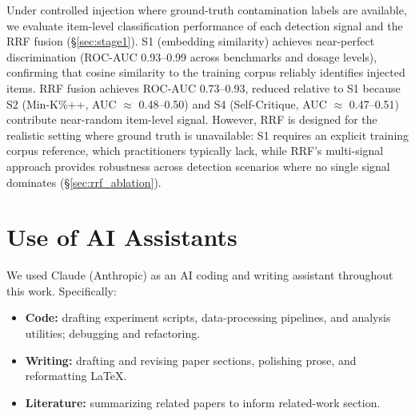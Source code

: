 Under controlled injection where ground-truth contamination labels are available, we evaluate item-level classification performance of each detection signal and the RRF fusion (\S\ref{sec:stage1}). S1 (embedding similarity) achieves near-perfect discrimination (ROC-AUC 0.93--0.99 across benchmarks and dosage levels), confirming that cosine similarity to the training corpus reliably identifies injected items. RRF fusion achieves ROC-AUC 0.73--0.93, reduced relative to S1 because S2 (Min-K\%++, AUC $\approx$ 0.48--0.50) and S4 (Self-Critique, AUC $\approx$ 0.47--0.51) contribute near-random item-level signal. However, RRF is designed for the realistic setting where ground truth is unavailable: S1 requires an explicit training corpus reference, which practitioners typically lack, while RRF's multi-signal approach provides robustness across detection scenarios where no single signal dominates (\S\ref{sec:rrf_ablation}).

\section{Use of AI Assistants}
\label{app:ai-assistants}

We used Claude (Anthropic) as an AI coding and writing assistant throughout this work. Specifically:
\begin{itemize}
    \item \textbf{Code:} drafting experiment scripts, data-processing pipelines, and analysis utilities; debugging and refactoring.
    \item \textbf{Writing:} drafting and revising paper sections, polishing prose, and reformatting LaTeX.
    \item \textbf{Literature:} summarizing related papers to inform related-work section.
\end{itemize}
